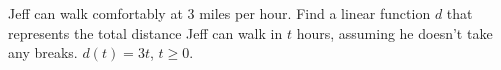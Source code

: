 {Jeff can walk comfortably at $3$ miles per hour.  Find a linear function $d$ that represents the total distance Jeff can walk in $t$ hours, assuming he doesn't take any breaks.}
{$d(t) = 3t$, $t \geq 0$.}